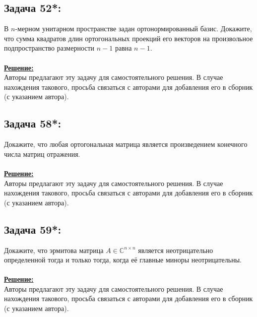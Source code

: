 \documentclass[a4paper,12pt,titlepage,final]{article}
\begin{document}
\subsection*{Задача 52*:}
\noindent В $n$-мерном унитарном пространстве задан ортонормированный базис. Докажите, что сумма квадратов длин ортогональных проекций его векторов на произвольное подпространство размерности $n-1$ равна $n-1$.\\ \\
\textbf{\underline{Решение:}} \\
Авторы предлагают эту задачу для самостоятельного решения. В случае нахождения такового, просьба связаться с авторами для добавления его в сборник (с указанием автора).

\subsection*{Задача 58*:}
\noindent Докажите, что любая ортогональная матрица является произведением конечного числа матриц отражения.\\ \\
\textbf{\underline{Решение:}} \\
Авторы предлагают эту задачу для самостоятельного решения. В случае нахождения такового, просьба связаться с авторами для добавления его в сборник (с указанием автора).

\subsection*{Задача 59*:}
\noindent Докажите, что эрмитова матрица $A \in \mathbb{C}^{n \times n}$ является неотрицательно определенной тогда и только тогда, когда её главные миноры неотрицательны.\\ \\
\textbf{\underline{Решение:}} \\
Авторы предлагают эту задачу для самостоятельного решения. В случае нахождения такового, просьба связаться с авторами для добавления его в сборник (с указанием автора).

\end{document}
